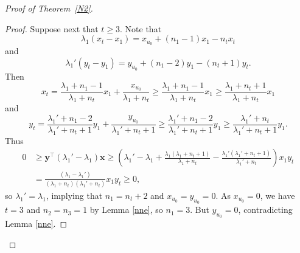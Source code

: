\documentclass[12pt]{article}
\numberwithin{equation}{section}
\begin{document}
\begin{proof}[Proof of Theorem~\ref{N2}]
\begin{proof}
Suppose next that $t\ge 3$. 
Note that 
\[
\lambda_1(x_t-x_1)=x_{u_0}+(n_1-1)x_1-n_tx_t
\]
and 
\[
\lambda_1'(y_t-y_1)=y_{u_0}+(n_1-2)y_1-(n_t+1)y_t.
\]
Then 
\[
x_t=\frac{\lambda_1+n_1-1}{\lambda_1+n_t}x_1+\frac{x_{u_0}}{\lambda_1+n_t}\ge \frac{\lambda_1+n_1-1}{\lambda_1+n_t}x_1\ge \frac{\lambda_1+n_t+1}{\lambda_1+n_t}x_1
\]
and 
\[
y_t=\frac{\lambda_1'+n_1-2}{\lambda_1'+n_t+1}y_1+\frac{y_{u_0}}{\lambda_1'+n_t+1}\ge \frac{\lambda_1'+n_1-2}{\lambda_1'+n_t+1}y_1\ge \frac{\lambda_1'+n_t}{\lambda_1'+n_t+1}y_1. 
\]
Thus
\begin{align*}
0& \ge\mathbf{y}^\top(\lambda_1'-\lambda_1)\mathbf{x}  \ge\left(\lambda_1'-\lambda_1+\frac{\lambda_1(\lambda_1+n_t+1)}{\lambda_1+n_t}-\frac{\lambda_1'(\lambda_1'+n_t+1)}{\lambda_1'+n_t}\right)x_1y_t\\
& =\frac{(\lambda_1-\lambda_1')}{(\lambda_1+n_t)(\lambda_1'+n_t)}x_1y_t
 \ge 0, 
\end{align*}
so $\lambda_1'=\lambda_1$, implying that $n_1=n_t+2$ and $x_{u_0}=y_{u_0}=0$. As $x_{u_0}=0$, we have 
$t=3$ and $n_2=n_3=1$ by Lemma \ref{nne},  so $n_1=3$. But $y_{u_0}=0$, contradicting Lemma \ref{nne}. 
%
%
%
%
%
%
%

\end{proof}
\end{proof}
\end{document}
